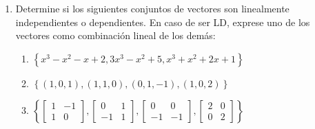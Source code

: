 \documentclass[12pt]{article}
\begin{document}
\begin{enumerate}
    \item Determine si los siguientes conjuntos de vectores son linealmente independientes o
          dependientes. En caso de ser LD, exprese uno de los vectores como combinaci\'on lineal de los dem\'as:
          \begin{enumerate}
              \item $\left\{x^3-x^2-x+2,3x^3-x^2+5,x^3+x^2+2x+1\right\}$
              \item $\left\{(1,0,1),(1,1,0),(0,1,-1),(1,0,2)\right\}$
              \item $\left\{
                        \begin{bmatrix}
                            1 & -1 \\
                            1 & 0
                        \end{bmatrix},
                        \begin{bmatrix}
                            0  & 1 \\
                            -1 & 1
                        \end{bmatrix},
                        \begin{bmatrix}
                            0  & 0  \\
                            -1 & -1
                        \end{bmatrix},
                        \begin{bmatrix}
                            2 & 0 \\
                            0 & 2
                        \end{bmatrix}\right\}$
          \end{enumerate}
\end{enumerate}
\end{document}
